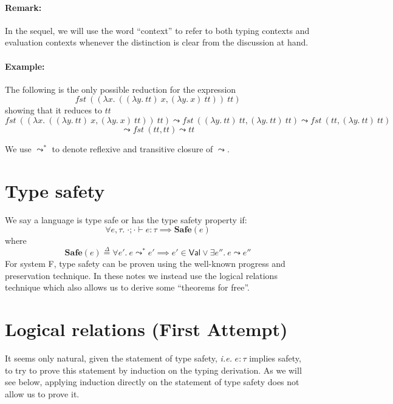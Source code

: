 \documentclass{article}
\newcommand{\ie}{\textit{i.e.}}
\newcommand{\fst}{\mathit{fst}}
\newcommand{\TT}{\mathit{tt}}
\newcommand{\VAL}{\mathsf{Val}}
\newcommand{\defeq}{\overset{\Delta}{=}}
\newcommand{\expr}{e}
\newcommand{\var}{x}
\newcommand{\varB}{y}
\newcommand{\typ}{\tau}
\newcommand{\typed}[4]{#1; #2 \vdash #3 : #4}
\newcommand{\step}{\leadsto}
\newcommand{\steps}{\leadsto^*}
\begin{document}
\paragraph{Remark:} In the sequel, we will use the word ``context''
to refer to both typing contexts and evaluation contexts whenever
the distinction is clear from the discussion at hand.

\paragraph{Example:} The following is the only possible reduction for the expression
\[\fst~((\lambda \var.~((\lambda \varB.~ \TT)~\var, (\lambda \varB.~ \var)~\TT))~\TT)\]
showing that it reduces to $\TT$
\[
\fst~((\lambda \var.~((\lambda \varB.~ \TT)~\var, (\lambda \varB.~ \var)~\TT))~\TT) \step
\fst~((\lambda \varB.~ \TT)~\TT, (\lambda \varB.~ \TT)~\TT) \step
\fst~(\TT, (\lambda \varB.~ \TT)~\TT)
\]
\[
\step \fst~(\TT, \TT) \step \TT
\]


We use $\steps$ to denote reflexive and transitive closure of $\step$.

\section{Type safety}
We say a language is type safe or has the type safety property if:
\[
\forall \expr, \typ.\; \typed{\cdot}{\cdot}{\expr}{\typ} \implies \mathbf{Safe}(\expr)
\]
where
\[
\mathbf{Safe}(\expr) \defeq \forall \expr'.~ \expr \steps \expr'
\implies \expr' \in \VAL \lor \exists \expr''.~\expr\step \expr''
\]
For system F, type safety can be proven using the well-known progress and preservation technique. In these notes we instead use the logical relations technique which also allows us to derive some ``theorems for free''.

\section{Logical relations (First Attempt)}
It seems only natural, given the statement of type safety, \ie{} $\expr : \typ$ implies safety, to try to prove this statement by induction on the typing derivation.
As we will see below, applying induction directly on the statement of type safety does not allow us to prove it.
\end{document}
